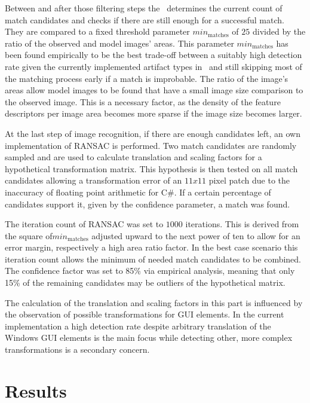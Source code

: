 Between and after those filtering steps the \vd~determines the current count of match candidates and checks if there are still enough for a successful match. They are compared to a fixed threshold parameter $min_{\text{matches}}$ of $25$ divided by the ratio of the observed and model images' areas. This parameter $min_{\text{matches}}$ has been found empirically to be the best trade-off between a suitably high detection rate given the currently implemented artifact types in \ape~and still skipping most of the matching process early if a match is improbable. The ratio of the image's areas allow model images to be found that have a small image size comparison to the observed image. This is a necessary factor, as the density of the feature descriptors per image area becomes more sparse if the image size becomes larger.

At the last step of image recognition, if there are enough candidates left, an own implementation of RANSAC is performed. Two match candidates are randomly sampled and are used to calculate translation and scaling factors for a hypothetical transformation matrix. This hypothesis is then tested on all match candidates allowing a transformation error of an $11x11$ pixel patch due to the inaccuracy of floating point arithmetic for C\#. If a certain percentage of candidates support it, given by the confidence parameter, a match was found.

The iteration count of RANSAC was set to $1000$ iterations. This is derived from the square of$min_{\text{matches}}$ adjusted upward to the next power of ten to allow for an error margin, respectively a high area ratio factor. In the best case scenario this iteration count allows the minimum of needed match candidates to be combined. The confidence factor was set to 85\% via empirical analysis, meaning that only 15\% of the remaining candidates may be outliers of the hypothetical matrix.

The calculation of the translation and scaling factors in this part is influenced by the observation of possible transformations for GUI elements. In the current implementation a high detection rate despite arbitrary translation of the Windows GUI elements is the main focus while detecting other, more complex transformations is a secondary concern.

\chapter{Results}\label{ch:results}

